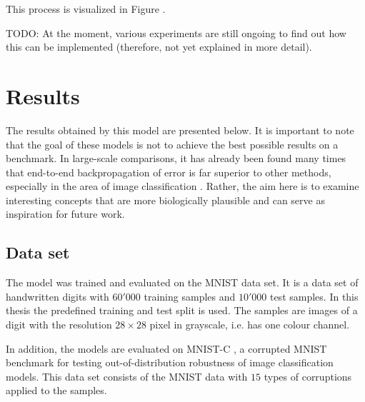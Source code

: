 This process is visualized in Figure . 


TODO: At the moment, various experiments are still ongoing to find out how this can be implemented (therefore, not yet explained in more detail).





\section{Results}
The results obtained by this model are presented below. It is important to note that the goal of these models is not to achieve the best possible results on a benchmark. In large-scale comparisons, it has already been found many times that end-to-end backpropagation of error is far superior to other methods, especially in the area of image classification . Rather, the aim here is to examine interesting concepts that are more biologically plausible and can serve as inspiration for future work.

\subsection{Data set}
The model was trained and evaluated on the MNIST \cite{Lecun_Bottou_Bengio_Haffner_1998} data set. It is a data set of handwritten digits with $60'000$ training samples and $10'000$ test samples.
In this thesis the predefined training and test split is used.
The samples are images of a digit with the resolution $28 \times 28$ pixel in grayscale, i.e. has one colour channel.

In addition, the models are evaluated on MNIST-C , a corrupted MNIST benchmark for testing out-of-distribution robustness of image classification models. This data set consists of the MNIST data with $15$ types of corruptions applied to the samples.

